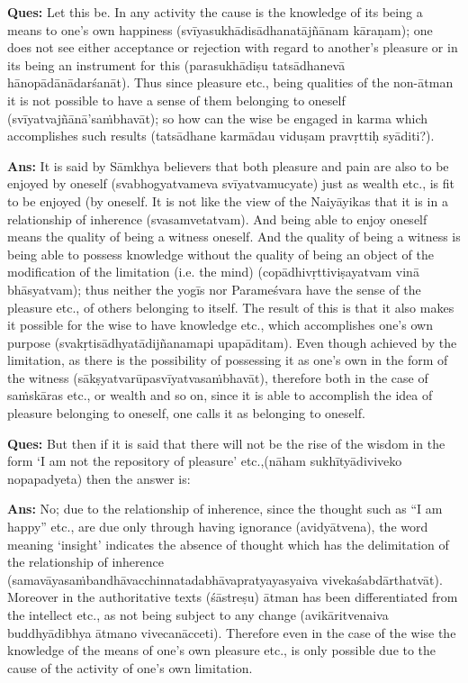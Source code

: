 \textbf{Ques:} Let this be. In any activity the cause is the knowledge of its being a means to one’s own happiness (svīyasukhādisādhanatājñānam kāraṇam); one does not see either acceptance or rejection with regard to another’s pleasure or in its being an instrument for this (parasukhādiṣu tatsādhanevā hānopādānādarśanāt). Thus since pleasure etc., being qualities of the non-ātman it is not possible to have a sense of them belonging to oneself (svīyatvajñānā’saṁbhavāt); so how can the wise be engaged in karma which accomplishes such results (tatsādhane karmādau viduṣam pravṛttiḥ syāditi?).

\textbf{Ans:} It is said by Sāmkhya believers that both pleasure and pain are also to be enjoyed by oneself (svabhogyatvameva svīyatvamucyate) just as wealth etc., is fit to be enjoyed (by oneself. It is not like the view of the Naiyāyikas that it is in a relationship of inherence (svasamvetatvam). And being able to enjoy oneself means the quality of being a witness oneself. And the quality of being a witness is being able to possess knowledge without the quality of being an object of the modification of the limitation (i.e. the mind) (copādhivṛttiviṣayatvam vinā bhāsyatvam); thus neither the yogīs nor Parameśvara have the sense of the pleasure etc., of others belonging to itself. The result of this is that it also makes it possible for the wise to have knowledge etc., which accomplishes one’s own purpose (svakṛtisādhyatādijñanamapi upapāditam). Even though achieved by the limitation, as there is the possibility of possessing it as one’s own in the form of the witness (sākṣyatvarūpasvīyatvasaṁbhavāt), therefore both in the case of saṁskāras etc., or wealth and so on, since it is able to accomplish the idea of pleasure belonging to oneself, one calls it as belonging to oneself.

\textbf{Ques:} But then if it is said that there will not be the rise of the wisdom in the form ‘I am not the repository of pleasure’ etc.,(nāham sukhītyādiviveko nopapadyeta) then the answer is:

\textbf{Ans:}  No; due to the relationship of inherence, since the thought such as “I am happy” etc., are due only through having ignorance (avidyātvena), the word meaning ‘insight’ indicates the absence of thought which has the delimitation of the relationship of inherence (samavāyasaṁbandhāvacchinnatadabhāvapratyayasyaiva vivekaśabdārthatvāt). Moreover in the authoritative texts (śāstreṣu) ātman has been differentiated from the intellect etc., as not being subject to any change (avikāritvenaiva buddhyādibhya ātmano vivecanācceti). Therefore even in the case of the wise the knowledge of the means of one’s own pleasure etc., is only possible due to the cause of the activity of one’s own limitation. 

